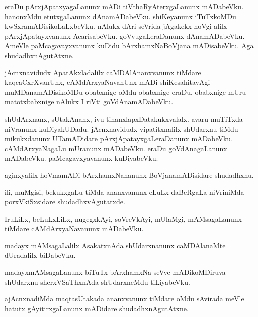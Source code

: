 \begin{mng}
eraDu pArxjApatxyagaLanunx mADi tiVthaRyAterxgaLanunx mADabeVku. hanonxMdu etutxgaLanunx dAnamADabeVku. shiKeyanunx iTuTxkoMDu kwSxramADisikoLaLxbeVku. nAlukx dAri seVrida jAgakekx hoVgi alilx pArxjApatayxvanunx AcarisabeVku. goVvugaLeraDanunx dAnamADabeVku. AmeVle paMcagavayxvanunx kuDidu bArxhamxNaBoVjana mADisabeVku. Aga shudadhxnAgutAtxne.
\end{mng}

\begin{mng}
jAcnxnavidudx ApatAkxladalilx caMDAlAnanxvanunx tiMdare kaqcaCxrXvanUnx, cAMdArxyaNavanUnx mADi shiKesahitavAgi muMDanamADisikoMDu obabxnige oMdu obabxnige eraDu, obabxnige mUru matotxbabxnige nAlukx I riVti goVdAnamADabeVku.
\end{mng}

\begin{mng}
shUdArxnanx, sUtakAnanx, ivu tinanxlapxDatakukxvalalx. avaru muTiTxda niVranunx kuDiyakUDadu. jAcnxnavidudx vipatitxnalilx shUdarxnu tiMdu mikukxdanunx UTamADidare pArxjApatayxgaLeraDanunx mADabeVku. cAMdArxyaNagaLu mUranunx mADabeVku. eraDu goVdAnagaLanunx mADabeVku. paMcagavxyavanunx kuDiyabeVku.
\end{mng}

\begin{mng}
aginxyalilx hoVmamADi bArxhamxNananunx BoVjanamADisidare shudadhxnu.
\end{mng}

\begin{mng}
ili, muMgisi, bekukxgaLu tiMda ananxvanunx eLuLx daBeRgaLa niVriniMda porxVkiSxsidare shudadhxvAgutatxde.
\end{mng}

\begin{mng}
IruLiLx, beLuLxLiLx, nugegxkAyi, soVreVkAyi, mUlaMgi, mAMsagaLanunx tiMdare cAMdArxyaNavanunx mADabeVku.
\end{mng}

\begin{mng}
madayx mAMsagaLalilx AsakatxnAda shUdarxnanunx caMDAlanaMte dUradalilx biDabeVku.
\end{mng}

\begin{mng}
madayxmAMsagaLanunx biTuTx bArxhamxNa seVve mADikoMDiruva shUdarxnu sherxVSaThxnAda shUdarxneMdu tiLiyabeVku.
\end{mng}

\begin{mng}
ajAcnxnadiMda maqtasUtakada ananxvanunx tiMdare oMdu sAvirada meVle hatutx gAyitirxgaLanunx mADidare shudadhxnAgutAtxne.
\end{mng}

